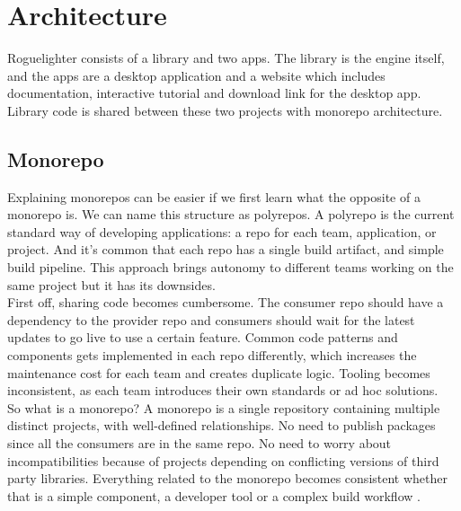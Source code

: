 \documentclass{article}
\begin{document}
\clearpage

\section{Architecture}

Roguelighter consists of a library and two apps. The library is the engine itself, and the apps are a desktop application and a website which includes documentation, interactive tutorial and download link for the desktop app. Library code is shared between these two projects with monorepo architecture.

\subsection{Monorepo}
Explaining monorepos can be easier if we first learn what the opposite of a monorepo is. We can name this structure as polyrepos. A polyrepo is the current standard way of developing applications: a repo for each team, application, or project. And it's common that each repo has a single build artifact, and simple build pipeline. This approach brings autonomy to different teams working on the same project but it has its downsides.\\

First off, sharing code becomes cumbersome. The consumer repo should have a dependency to the provider repo and consumers should wait for the latest updates to go live to use a certain feature. Common code patterns and components gets implemented in each repo differently, which increases the maintenance cost for each team and creates duplicate logic. Tooling becomes inconsistent, as each team introduces their own standards or ad hoc solutions.\\

So what is a monorepo? A monorepo is a single repository containing multiple distinct projects, with well-defined relationships. No need to publish packages since all the consumers are in the same repo. No need to worry about incompatibilities because of projects depending on conflicting versions of third party libraries. Everything related to the monorepo becomes consistent whether that is a simple component, a developer tool or a complex build workflow \cite{monorepo}.
\end{document}
